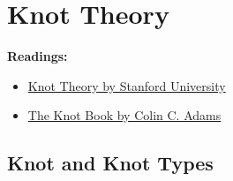 
\chapter{Knot Theory}
\textbf{Readings:}
\begin{itemize}
\item \href{https://stanford.edu/~sfh/knot.pdf}{Knot Theory by Stanford University}
\item \href{https://www.math.cuhk.edu.hk/course_builder/1920/math4900e/Adams--The%20Knot%20Book.pdf}{The Knot Book by Colin C. Adams}
\end{itemize}

\section{Knot and Knot Types}
